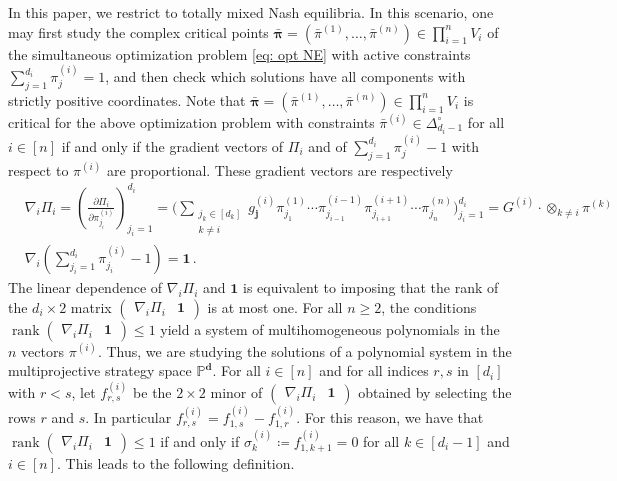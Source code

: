\documentclass[12pt]{article}
\theoremstyle{definition}
\newcommand{\PP}{{\mathbb P}}
\def\bj{{\boldsymbol{j}}}
\def\bd{{\boldsymbol{d}}}
\def\bpi{{\boldsymbol{\pi}}}
\def\bone{{\boldsymbol{1}}}
\def\rank{\operatorname{rank}}
\begin{document}
In this paper, we restrict to totally mixed Nash equilibria. In this scenario, one may first study the complex critical points $\bar{\bpi}=(\bar{\pi}^{(1)},\ldots,\bar{\pi}^{(n)})\in\prod_{i=1}^n V_i$ of the simultaneous optimization problem \eqref{eq: opt NE} with active constraints $\sum_{j=1}^{d_i}\pi_j^{(i)}=1$, and then check which solutions have all components with strictly positive coordinates. Note that $\bar{\bpi}=(\bar{\pi}^{(1)},\ldots,\bar{\pi}^{(n)})\in\prod_{i=1}^n V_i$ is critical for the above optimization problem with constraints $\bar{\pi}^{(i)}\in\Delta_{d_i-1}^\circ$ for all $i\in[n]$ if and only if the gradient vectors of $\Pi_i$ and of $\sum_{j=1}^{d_i}\pi_j^{(i)}-1$ with respect to $\pi^{(i)}$ are proportional. These gradient vectors are respectively
\begin{align*}
    &\nabla_i\Pi_i = \left(\frac{\partial\Pi_i}{\partial \pi_{j_i}^{(i)}}\right)_{j_i=1}^{d_i} = \Bigg(\sum_{\substack{j_k\in[d_k]\\k\neq i}}g_{\bj}^{(i)}\pi_{j_1}^{(1)}\cdots\pi_{j_{i-1}}^{(i-1)}\pi_{j_{i+1}}^{(i+1)}\cdots\pi_{j_n}^{(n)}\Bigg)_{j_i=1}^{d_i} = G^{(i)}\cdot\otimes_{k\neq i}\pi^{(k)}\\
    &\nabla_i\left(\sum_{j_i=1}^{d_i}\pi_{j_i}^{(i)}-1\right) = \bone\,.
\end{align*}
The linear dependence of $\nabla_i\Pi_i$ and $\bone$ is equivalent to imposing that the rank of the $d_i \times 2$ matrix $\begin{pmatrix}\nabla_i\Pi_i &\bone\end{pmatrix}$ is at most one.
For all $n \ge 2$, the conditions $\rank\begin{pmatrix}\nabla_i\Pi_i &\bone\end{pmatrix}\le 1$ yield a system of multihomogeneous polynomials in the $n$ vectors $\pi^{(i)}$. Thus, we are studying the solutions of a polynomial system in the multiprojective strategy space $\PP^\bd$. For all $i\in[n]$ and for all indices $r,s$ in $[d_i]$ with $r<s$, let $f_{r,s}^{(i)}$ be the $2\times 2$ minor of $\begin{pmatrix}\nabla_i\Pi_i &\bone\end{pmatrix}$ obtained by selecting the rows $r$ and $s$. In particular $f_{r,s}^{(i)}=f_{1,s}^{(i)}-f_{1,r}^{(i)}$. For this reason, we have that $\rank\begin{pmatrix}\nabla_i\Pi_i &\bone\end{pmatrix}\le 1$ if and only if $\sigma_k^{(i)}\coloneqq f_{1,k+1}^{(i)}=0$ for all $k\in[d_i-1]$ and $i\in[n]$. This leads to the following definition.
\end{document}
